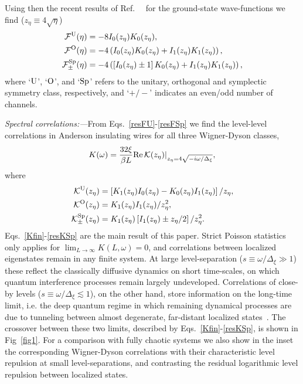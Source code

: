 \documentclass[twocolumn,showpacs,aps,prl]{revtex4}
\begin{document}
Using then the recent results of Ref.~~\cite{Khalaf,SuppMat}
for the ground-state wave-functions 
we find
($z_\eta\equiv4\sqrt{\eta}$)
\begin{align}
\label{resFU}
{\cal F}^{\rm U}(\eta)
&= 
-8I_0(z_\eta)K_0(z_\eta),
\\
\label{resFO}
{\cal F}^{\rm O}(\eta) 
&=  
-4\left( 
I_0(z_\eta)K_0(z_\eta)
+
I_1(z_\eta)K_1(z_\eta)
 \right),
 \\
 \label{resFSp}
{\cal F}_\pm^{\rm Sp}(\eta) 
&=
-4\left( 
\left[ 
I_0(z_\eta)
\pm
1
\right]
K_0(z_\eta)
+
I_1(z_\eta)K_1(z_\eta)
 \right),
 \end{align}
where 
`${\rm U}$',
 `${\rm O}$',
 and
 `${\rm Sp}$'
refers to the unitary, orthogonal and symplectic 
 symmetry class, respectively, and
 `$+/-$' indicates an even/odd number of channels. 




{\it Spectral correlations:---}From Eqs.~\eqref{resFU}-\eqref{resFSp} we find
the level-level correlations in Anderson insulating wires for all 
three Wigner-Dyson classes,
\begin{align}
\label{Kfin}
K(\omega)=
{32 \xi \over \beta L }
 {\rm Re} \,
 {\cal K}(z_\eta)|_{z_\eta=4\sqrt{-i\omega/\Delta_\xi}},
 \end{align}
where
\begin{align}
\label{resKU}
 {\cal K}^{\rm U}(z_\eta)
&=   
\left[
K_1(z_\eta) I_0(z_\eta)
-
K_0(z_\eta) I_1(z_\eta)
\right]/z_\eta,
\\
\label{resKO}
{\cal K}^{\rm O}(z_\eta)
&=  
K_1(z_\eta) I_1(z_\eta)/z^2_\eta,
 \\
 \label{resKSp}
{\cal K}_\pm^{\rm Sp}(z_\eta)
&=
 K_1(z_\eta)
 \left[
 I_1(z_\eta)
  \pm
z_\eta/2
 \right]/z^2_\eta.
 \end{align}
Eqs.~\eqref{Kfin}-\eqref{resKSp} are the main result of this paper.
Strict Poisson statistics only applies for 
$\lim_{L\to\infty}K(L,\omega)=0$, and 
correlations between localized eigenstates remain in any finite system. 
At large level-separation ($s\equiv \omega/\Delta_\xi\gg1$) 
these reflect the classically diffusive dynamics on short time-scales, on which 
quantum interference processes remain largely undeveloped. 
Correlations of close-by levels ($s\equiv\omega/\Delta_\xi\lesssim1$), 
on the other hand, store information on the long-time limit, 
i.e. the deep quantum regime 
in which remaining dynamical processes are due to 
tunneling between almost degenerate,  
far-distant localized states~\cite{Mott,log,Ivanov2012}.
The crossover between these two limits, described
by Eqs.~\eqref{Kfin}-\eqref{resKSp}, is shown in Fig~\ref{fig1}. 
For a comparison with fully chaotic systems
we also show in the inset the corresponding Wigner-Dyson correlations   
with their characteristic level repulsion 
at small 
level-separations,   
and contrasting the residual logarithmic level repulsion between 
localized states. 
\end{document}
